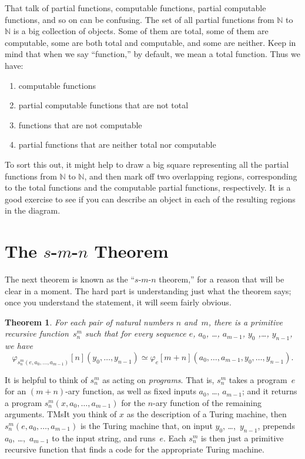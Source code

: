 \documentclass[10pt,a4paper]{article}
\theoremstyle{plain}
\newtheorem{thm}{Theorem}[section]
\theoremstyle{definition}
\theoremstyle{remark}
\newenvironment{explain}{}{}
\newcommand*{\olfileid}[3]{}
\newcommand*{\olsection}[1]{\section*{#1}}
\newcommand*{\ollabel}[1]{\label{#1}}
\providecommand{\cfind}[1]{\varphi_{#1}}
\providecommand{\Nat}{\ensuremath{\mathbb{N}}}
\providecommand{\iftag}[1]{#1}
\begin{document}
That talk of partial functions, computable functions,
partial computable functions, and so on can be confusing. The set of
all partial functions from $\Nat$ to $\Nat$ is a big collection of
objects. Some of them are total, some of them are computable, some are
both total and computable, and some are neither. Keep in mind that
when we say ``function,'' by default, we mean a total function. Thus we
have:
\begin{enumerate}
\item computable functions
\item partial computable functions that are not total
\item functions that are not computable
\item partial functions that are neither total nor computable
\end{enumerate}
To sort this out, it might help to draw a big square representing all
the partial functions from $\Nat$ to $\Nat$, and then mark off two
overlapping regions, corresponding to the total functions and the
computable partial functions, respectively. It is a good exercise to
see if you can describe an object in each of the resulting regions in
the diagram.





\olfileid{cmp}{thy}{smn}
\olsection{The $s$-$m$-$n$ Theorem}

\begin{explain}
The next theorem is known as the ``$s$-$m$-$n$ theorem,'' for a reason
that will be clear in a moment. The hard part is understanding just
what the theorem says; once you understand the statement, it will seem
fairly obvious.
\end{explain}

\begin{thm}
\ollabel{thm:s-m-n}
  For each pair of natural numbers $n$ and~$m$, there is a primitive
  recursive function~$s^m_n$ such that for every sequence
  $e$, $a_0$, \dots, $a_{m-1}$, $y_0$ ,\dots, $y_{n-1}$, we have
  \[
  \cfind{s^m_n(e, a_0, \dots, a_{m-1})}[n](y_0, \dots, y_{n-1}) \simeq
  \cfind{e}[m+n](a_0, \dots, a_{m-1}, y_0, \dots, y_{n-1}).
\]
\end{thm}

\begin{explain}
It is helpful to think of $s^m_n$ as acting on \emph{programs}. That
is, $s^m_n$ takes a program~$e$ for an $(m+n)$-ary function, as well
as fixed inputs $a_0$, \dots, $a_{m-1}$; and it returns a program
$s^m_n(x, a_0, \dots, a_{m-1})$ for the $n$-ary function of the
remaining arguments. \iftag{TMs}{It you think of $x$ as the description of a
Turing machine, then $s^m_n(e, a_0, \dots, a_{m-1})$ is the Turing
machine that, on input $y_0$, \dots,~$y_{n-1}$, prepends
$a_0$, \dots,~$a_{m-1}$ to the input string, and runs~$e$. Each $s^m_n$
is then just a primitive recursive function that finds a code for the
appropriate Turing machine.}{}
\end{explain}
\end{document}
